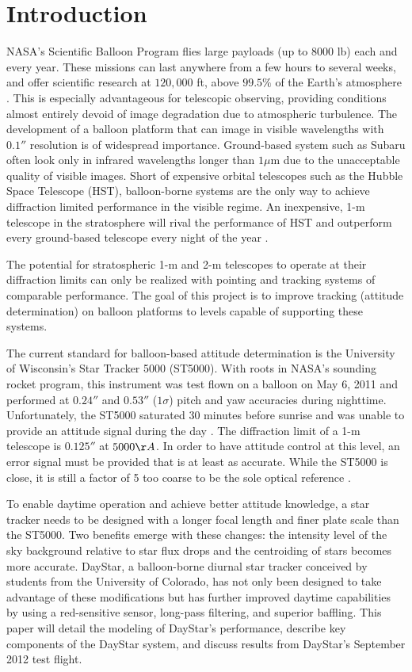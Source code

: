 \documentclass[twocolumn,letterpaper]{IEEEAerospace2012}
\begin{document}
\section{Introduction}
NASA's Scientific Balloon Program flies large payloads (up to 8000 lb) each and every year. These missions can last anywhere from a few hours to several weeks, and offer scientific research at $120,000$ ft, above $99.5\%$ of the Earth's atmosphere \cite{young2012}. This is especially advantageous for telescopic observing, providing conditions almost entirely devoid of image degradation due to atmospheric turbulence. The development of a balloon platform that can image in visible wavelengths with $0.1''$ resolution is of widespread importance. Ground-based system such as Subaru often look only in infrared wavelengths longer than $1 \mu$m due to the unacceptable quality of visible images. Short of expensive orbital telescopes such as the Hubble Space Telescope (HST), balloon-borne systems are the only way to achieve diffraction limited performance in the visible regime. An inexpensive, 1-m telescope in the stratosphere will rival the performance of HST and outperform every ground-based telescope every night of
the year \cite{young2012}.

The potential for stratospheric 1-m and 2-m telescopes to operate at their diffraction limits can only be realized with pointing and tracking systems of comparable performance. The goal of this project is to improve tracking (attitude determination) on balloon platforms to levels capable of supporting these systems.

The current standard for balloon-based attitude determination is the University of Wisconsin's Star Tracker 5000 (ST5000). With roots in NASA's sounding rocket program, this instrument was test flown on a balloon on May 6, 2011 and performed at $0.24''$ and $0.53''$ ($1\sigma$) pitch and yaw accuracies during nighttime. Unfortunately, the ST5000 saturated 30 minutes before sunrise and was unable to provide an attitude signal during the day \cite{young2012}. The diffraction limit of a 1-m telescope is $0.125''$ at $5000 \AA{}$. In order to have attitude control at this level, an error signal must be provided that is at least as accurate. While the ST5000 is close, it is still a factor of 5 too coarse to be the sole optical reference \cite{young2012}.

To enable daytime operation and achieve better attitude knowledge, a star tracker needs to be designed with a longer focal length and finer plate scale than the ST5000. Two benefits emerge with these changes: the intensity level of the sky background relative to star flux drops and the centroiding of stars becomes more accurate. DayStar, a balloon-borne diurnal star tracker conceived by students from the University of Colorado, has not only been designed to take advantage of these modifications but has further improved daytime capabilities by using a red-sensitive sensor, long-pass filtering, and superior baffling. This paper will detail the modeling of DayStar's performance, describe key components of the DayStar system, and discuss results from DayStar's September 2012 test flight.
\end{document}
